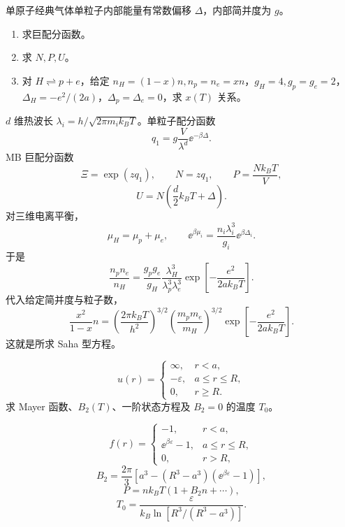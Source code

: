 \begin{question}
单原子经典气体单粒子内部能量有常数偏移 $\Delta$，内部简并度为 $g$。
\begin{enumerate}
\item 求巨配分函数。
\item 求 $N,P,U$。
\item 对 $H\rightleftharpoons p+e$，给定 $n_H=(1-x)n,n_p=n_e=xn$，$g_H=4,g_p=g_e=2$，$\Delta_H=-e^2/(2a)$，$\Delta_p=\Delta_e=0$，求 $x(T)$ 关系。
\end{enumerate}
\begin{solution}
$d$ 维热波长 $\lambda_i=h/\sqrt{2\pi m_i k_BT}$。单粒子配分函数
\[q_1=g\frac{V}{\lambda^d}\ee^{-\beta\Delta}.\]
MB 巨配分函数
\[\boxed{\Xi=\exp(zq_1)},\qquad \boxed{N=zq_1},\qquad \boxed{P=\frac{Nk_BT}{V}},\]
\[\boxed{U=N\left(\frac d2k_BT+\Delta\right)}.\]
对三维电离平衡，
\[\mu_H=\mu_p+\mu_e,\qquad \ee^{\beta\mu_i}=\frac{n_i\lambda_i^3}{g_i}\ee^{\beta\Delta_i}.\]
于是
\[\frac{n_pn_e}{n_H}=\frac{g_pg_e}{g_H}\frac{\lambda_H^3}{\lambda_p^3\lambda_e^3}\exp\!\left[-\frac{e^2}{2ak_BT}\right].\]
代入给定简并度与粒子数，
\[\boxed{\frac{x^2}{1-x}n=\left(\frac{2\pi k_BT}{h^2}\right)^{3/2}\left(\frac{m_pm_e}{m_H}\right)^{3/2}\exp\!\left[-\frac{e^2}{2ak_BT}\right]}.\]
这就是所求 Saha 型方程。
\end{solution}
\end{question}

\begin{question}
\[u(r)=\begin{cases}\infty,&r<a,\\-\varepsilon,&a\le r\le R,\\0,&r\ge R.\end{cases}\]
求 Mayer 函数、$B_2(T)$、一阶状态方程及 $B_2=0$ 的温度 $T_0$。
\begin{solution}
\[f(r)=\begin{cases}-1,&r<a,\\\ee^{\beta\varepsilon}-1,&a\le r\le R,\\0,&r>R,\end{cases}\]
\[\boxed{B_2=\frac{2\pi}{3}\left[a^3-(R^3-a^3)(\ee^{\beta\varepsilon}-1)\right]},\]
\[\boxed{P=nk_BT(1+B_2n+\cdots)},\]
\[\boxed{T_0=\frac{\varepsilon}{k_B\ln[R^3/(R^3-a^3)]}}.\]
\end{solution}
\end{question}
